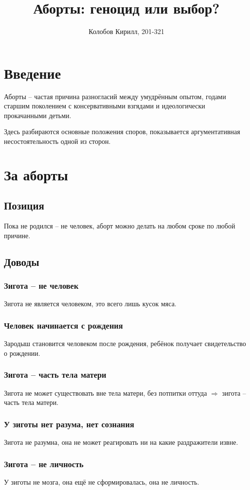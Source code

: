 \documentclass[a4paper,12pt]{report}
\author{Колобов Кирилл, 201-321}
\date{}
\title{Аборты: геноцид или выбор?}
\begin{document}
\maketitle
\tableofcontents


\part{Введение}
Аборты -- частая причина разногласий между умудрённым опытом, годами старшим поколением 
с консервативными взгядами и идеологически прокачанными детьми.

Здесь разбираются основные положения споров, показывается аргументативная несостоятельность одной из сторон.


\part{За аборты}
\chapter{Позиция}
    Пока не родился -- не человек, аборт можно делать на любом сроке по любой причине.
\chapter{Доводы}
    \section{Зигота -- не человек}
        Зигота не является человеком, это всего лишь кусок мяса.
    \section{Человек начинается с рождения}
        Зародыш становится человеком после рождения, ребёнок получает свидетельство о рождении.
    \section{Зигота -- часть тела матери}
        Зигота не может существовать вне тела матери, без потпитки оттуда $\Rightarrow$ зигота -- часть тела матери.
    \section{У зиготы нет разума, нет сознания}
        Зигота не разумна, она не может реагировать ни на какие раздражители извне.
    \section{Зигота -- не личность}
        У зиготы не мозга, она ещё не сформировалась, она не личность.
\end{document}
